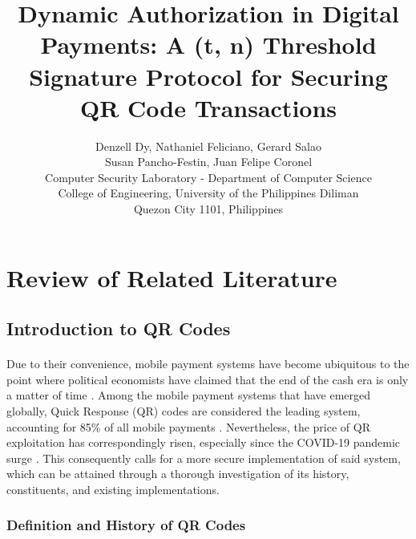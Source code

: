 \documentclass[a4paper]{scl-article}
\begin{document}
\title{Dynamic Authorization in Digital Payments: A (t, n) Threshold Signature Protocol for Securing QR Code Transactions}


\author{Denzell Dy, Nathaniel Feliciano, Gerard Salao \\ 
Susan Pancho-Festin, Juan Felipe Coronel \\ 
Computer Security Laboratory - Department of Computer Science \\ College of Engineering, University of the Philippines Diliman \\ Quezon City 1101, Philippines}




\maketitle
\section{Review of Related Literature}
\label{header:rrl}
\subsection{Introduction to QR Codes}
\label{sect:rrl_1}
\paragraph{}Due to their convenience, mobile payment systems have become ubiquitous to the point where political economists have claimed that the end of the cash era is only a matter of time \cite{rulyfayrizqi2019}. Among the mobile payment systems that have emerged globally, Quick Response (QR) codes are considered the leading system, accounting for 85\% of all mobile payments \cite{tu2022}. Nevertheless, the price of QR exploitation has correspondingly risen, especially since the COVID-19 pandemic surge \cite{sonowal2024}. This consequently calls for a more secure implementation of said system, which can be attained through a thorough investigation of its history, constituents, and existing implementations.


\subsubsection{Definition and History of QR Codes}
\label{sect:rrl_1a}
\end{document}
